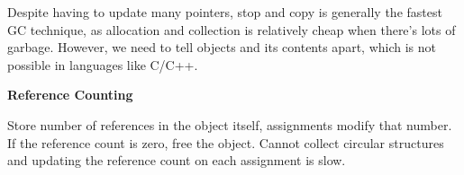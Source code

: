 Despite having to update many pointers, stop and copy is generally the fastest GC technique, as allocation and collection is relatively cheap when there's lots of garbage. However, we need to tell objects and its contents apart, which is not possible in languages like C/C++. \medskip

\textbf{Reference Counting }\smallskip
	
Store number of references in the object itself, assignments modify that number. If the reference count is zero, free the object. Cannot collect circular structures and updating the reference count on each assignment is slow.
